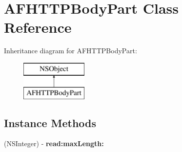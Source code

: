 \hypertarget{interface_a_f_h_t_t_p_body_part}{}\section{A\+F\+H\+T\+T\+P\+Body\+Part Class Reference}
\label{interface_a_f_h_t_t_p_body_part}
Inheritance diagram for A\+F\+H\+T\+T\+P\+Body\+Part\+:\begin{figure}[H]
\begin{center}
\leavevmode
\includegraphics[height=2.000000cm]{interface_a_f_h_t_t_p_body_part}
\end{center}
\end{figure}
\subsection*{Instance Methods}
\begin{DoxyCompactItemize}
\item 
\hypertarget{interface_a_f_h_t_t_p_body_part_ac6ae29af0ce8cb181e029696c6477a78}{}(N\+S\+Integer) -\/ {\bfseries read\+:max\+Length\+:}\label{interface_a_f_h_t_t_p_body_part_ac6ae29af0ce8cb181e029696c6477a78}

\end{DoxyCompactItemize}
